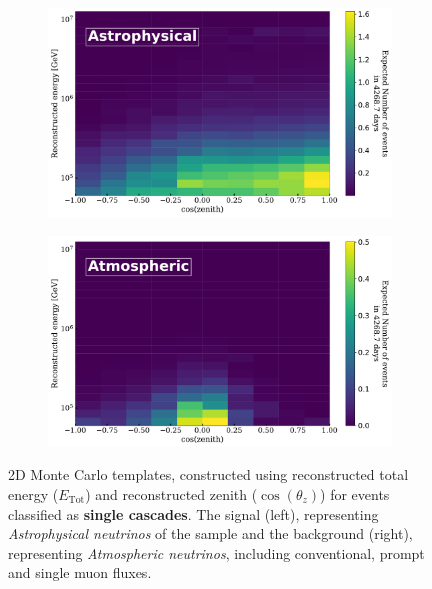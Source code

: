 \begin{figure}[h!]
    \begin{subfigure}[h]{0.72\textwidth}
        \includegraphics{./figures/Analysis/Cascades_Astrophysical.pdf}
    \end{subfigure}
    \hfill
    \begin{subfigure}[h]{0.72\textwidth}
        \includegraphics{./figures/Analysis/Cascades_Atmospheric.pdf}
       
    \end{subfigure}%
    \caption[2D Monte Carlo templates for cascade sample for astrophysical and atmopsheric fluxes]{2D Monte Carlo templates, constructed using reconstructed total energy ($E_{\text{Tot}}$) and reconstructed zenith ($\cos(\theta_z)$) for events classified as \textbf{single cascades}. The signal (left), representing \emph{Astrophysical neutrinos} of the sample and the background (right), representing \emph{Atmospheric neutrinos}, including conventional, prompt and single muon fluxes.}
\end{figure}

